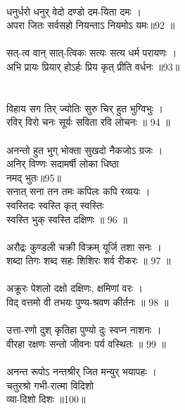 \\
धनुर्धरो धनुर् वेदो दण्डो दम-यिता दमः ।\\
अपरा जितः सर्वसहो नियन्ताऽ नियमोऽ यमः॥92 ॥\\
\\
सत्-त्व वान् सात्-त्विकः सत्यः सत्य धर्म परायणः ।\\
अभि प्रायः प्रियार् होऽर्हः प्रिय कृत्  प्रीति वर्धनः ॥93॥\\
\\
\\
विहाय सग तिर् ज्योतिः सुरु चिर् हुत भुग्विभुः ।\\
रविर् विरो चनः सूर्यः सविता रवि लोचनः ॥ 94 ॥\\
\\
अनन्तो हुत भुग् भोक्ता सुखदो नैकजोऽ ग्रजः ।\\
अनिर् विण्णः सदामर्षी लोका धिष्ठा\\
 नमद् भुतः॥95॥\\
सनात् सना तन तमः कपिलः कपि रव्ययः ।\\
स्वस्तिदः स्वस्ति कृत् स्वस्तिः \\
स्वस्ति भुक् स्वस्ति दक्षिणः ॥ 96 ॥\\
\\
अरौद्रः कुण्डली चक्री विक्रम् यूर्जि तशा सनः ।\\
शब्दा तिगः शब्द सहः शिशिरः शर्व रीकरः ॥ 97 ॥\\
\\
अक्रूरः पेशलो दक्षो दक्षिणः, क्षमिणां वरः ।\\
विद् वत्तमो वी तभयः पुण्य-श्रवण कीर्तनः ॥ 98 ॥\\
\\
उत्ता-रणो दुश् कृतिहा पुण्यो दुः स्वप्न नाशनः ।\\
वीरहा रक्षणः सन्तो जीवनः पर्य वस्थितः ॥ 99 ॥\\
\\
अनन्त रूपोऽ नन्तश्रीर् जित मन्युर् भयापहः ।\\
चतुरश्रो गभी-रात्मा विदिशो \\
व्या-दिशो दिशः ॥100॥\\
